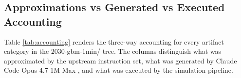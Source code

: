 
\subsection{Approximations vs Generated vs Executed Accounting}
\label{sec:limits-accounting}

Table \ref{tab:accounting} renders the three-way accounting for
every artifact category in the 2030-gbm-1min/ tree. The columns
distinguish what was approximated by the upstream instruction set,
what was generated by Claude Code Opus 4.7 1M Max
\cite{claude-opus-47, claude-code, one-minute-variant-instructions},
and what was executed by the simulation pipeline.

